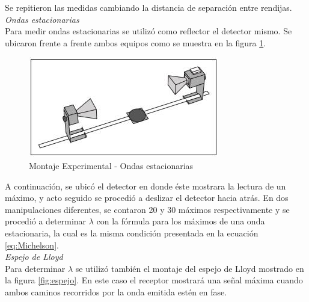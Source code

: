 \documentclass[%
 reprint,
 amsmath,amssymb,
 aps,
]{revtex4-1}
\begin{document}
Se repitieron las medidas cambiando la distancia de separación entre rendijas.\\ 

\textit{Ondas estacionarias} \\

Para medir ondas estacionarias se utilizó como reflector el detector mismo. Se ubicaron frente a frente ambos equipos como se muestra en la figura \ref{fig:estacionarias}. \\

\begin{figure}[h!]
\centering
\includegraphics[width=0.7\linewidth]{Pictures/estacionarias}
\caption{Montaje Experimental - Ondas estacionarias}
\label{fig:estacionarias}
\end{figure}

A continuación, se ubicó el detector en donde éste mostrara la lectura de un máximo, y acto seguido se procedió a deslizar el detector hacia atrás. En dos manipulaciones diferentes, se contaron 20 y 30 máximos respectivamente y se procedió a determinar $ \lambda $ con la fórmula para los máximos de una onda estacionaria, la cual es la misma condición presentada en la ecuación \ref{eq:Michelson}. \\ 

\textit{Espejo de Lloyd} \\

Para determinar $ \lambda $ se utilizó también el montaje del espejo de Lloyd mostrado en la figura \ref{fig:espejo}. En este caso el receptor mostrará una señal máxima cuando ambos caminos recorridos por la onda emitida estén en fase. \\
\end{document}
